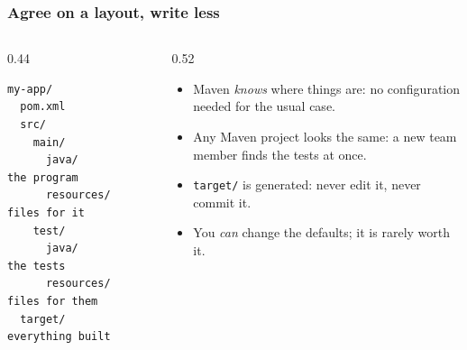 \documentclass[aspectratio=169,10pt,compress]{beamer}
\begin{document}
\begin{frame}[t,fragile] \frametitle{Agree on a layout, write less}
  \begin{columns}[T]
    \begin{column}{0.44\textwidth}


\begin{lstlisting}[style=codesnippet, language={}, basicstyle=\ttfamily\footnotesize]
my-app/
  pom.xml
  src/
    main/
      java/         the program
      resources/    files for it
    test/
      java/         the tests
      resources/    files for them
  target/           everything built
\end{lstlisting}


    \end{column}
    \begin{column}{0.52\textwidth}
      \begin{itemize}\small
        \item Maven \emph{knows} where things are: no configuration needed for the usual case.
        \item Any Maven project looks the same: a new team member finds the tests at once.
        \item \texttt{target/} is generated: never edit it, never commit it.
        \item You \emph{can} change the defaults; it is rarely worth it.
      \end{itemize}
    \end{column}
  \end{columns}
\end{frame}

\end{document}
